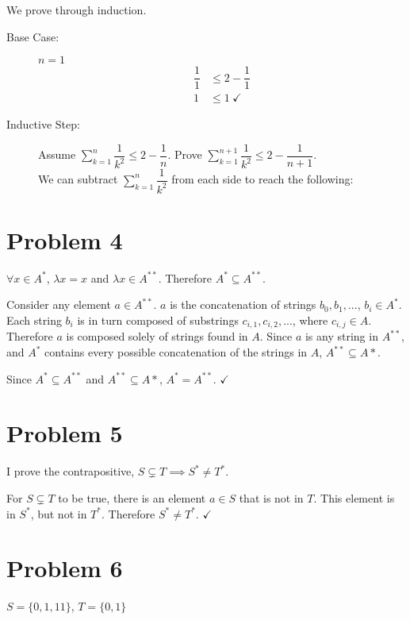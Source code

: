 \documentclass[11pt]{article}
\begin{document}
We prove through induction.
\begin{description}
	\item[Base Case:] $n= 1$
		\begin{align*}
				\dfrac{1}{1} &\leq 2 - \dfrac{1}{1}\\
				1 &\leq 1\ \checkmark
		\end{align*}
		
	\item[Inductive Step:] Assume $\sum\limits_{k=1}^n \dfrac{1}{k^2} \leq 2 - \dfrac{1}{n}$. Prove $\sum\limits_{k=1}^{n+1} \dfrac{1}{k^2} \leq 2 - \dfrac{1}{n+1}$. \\
	We can subtract $\sum\limits_{k=1}^{n} \dfrac{1}{k^2}$ from each side to reach the following:


\end{description}

\section*{Problem 4}

$\forall x \in A^*$, $\lambda x = x$ and $ \lambda x \in A^{**}$. Therefore $A^* \subseteq A^{**}$.

Consider any element $a \in A^{**}$. $a$ is the concatenation of strings $b_0, b_1,...$, $b_i \in A^*$. Each string $b_i$ is in turn composed of substrings $c_{i,1}, c_{i,2}, ...$, where $c_{i,j} \in A$. Therefore $a$ is composed solely of strings found in $A$. Since $a$ is any string in $A^{**}$, and $A^*$ contains every possible concatenation of the strings in $A$, $A^{**} \subseteq A*$.


Since $A^* \subseteq A^{**}$ and $A^{**} \subseteq A*$, $A^* = A^{**}$. $\checkmark$

\section*{Problem 5}

I prove the contrapositive, $ S \subsetneq T \implies S^* \neq T^*$.


For $S \subsetneq T$ to be true, there is an element $a \in S$ that is not in $T$. This element is in $S^*$, but not in $T^*$. Therefore $S^* \neq T^*$. $\checkmark$

\section*{Problem 6}
$ S = \{0, 1, 11\}$, $T = \{0, 1\}$
\end{document}
